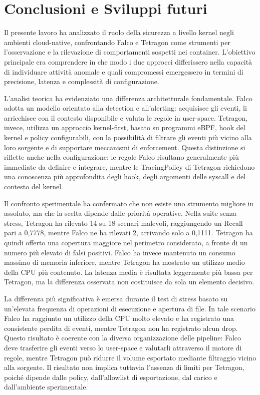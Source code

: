 \documentclass[12pt,a4paper,openright,twoside]{book}
\newcommand{\userspace}{\mbox{user-space}\xspace}
\begin{document}

\chapter{Conclusioni e Sviluppi futuri}
\label{chap:conclusion}

Il presente lavoro ha analizzato il ruolo della sicurezza a livello kernel negli ambienti cloud-native, confrontando Falco e Tetragon come strumenti per l'osservazione e la rilevazione di comportamenti sospetti nei container. L'obiettivo principale era comprendere in che modo i due approcci differissero nella capacità di individuare attività anomale e quali compromessi emergessero in termini di precisione, latenza e complessità di configurazione.

L'analisi teorica ha evidenziato una differenza architetturale fondamentale. Falco adotta un modello orientato alla detection e all'alerting: acquisisce gli eventi, li arricchisce con il contesto disponibile e valuta le regole in \userspace. Tetragon, invece, utilizza un approccio kernel-first, basato su programmi eBPF, hook del kernel e policy configurabili, con la possibilità di filtrare gli eventi più vicino alla loro sorgente e di supportare meccanismi di enforcement. Questa distinzione si riflette anche nella configurazione: le regole Falco risultano generalmente più immediate da definire e integrare, mentre le TracingPolicy di Tetragon richiedono una conoscenza più approfondita degli hook, degli argomenti delle syscall e del contesto del kernel.

Il confronto sperimentale ha confermato che non esiste uno strumento migliore in assoluto, ma che la scelta dipende dalle priorità operative. Nella suite senza stress, Tetragon ha rilevato 14 su 18 scenari malevoli, raggiungendo un Recall pari a 0,7778, mentre Falco ne ha rilevati 2, arrivando solo a 0,1111. Tetragon ha quindi offerto una copertura maggiore nel perimetro considerato, a fronte di un numero più elevato di falsi positivi. Falco ha invece mantenuto un consumo massimo di memoria inferiore, mentre Tetragon ha mostrato un utilizzo medio della CPU più contenuto. La latenza media è risultata leggermente più bassa per Tetragon, ma la differenza osservata non costituisce da sola un elemento decisivo.

La differenza più significativa è emersa durante il test di stress basato su un'elevata frequenza di operazioni di esecuzione e apertura di file. In tale scenario Falco ha raggiunto un utilizzo della CPU molto elevato e ha registrato una consistente perdita di eventi, mentre Tetragon non ha registrato alcun drop. Questo risultato è coerente con la diversa organizzazione delle pipeline: Falco deve trasferire gli eventi verso lo \userspace e valutarli attraverso il motore di regole, mentre Tetragon può ridurre il volume esportato mediante filtraggio vicino alla sorgente. Il risultato non implica tuttavia l'assenza di limiti per Tetragon, poiché dipende dalle policy, dall'allowlist di esportazione, dal carico e dall'ambiente sperimentale.
\end{document}
